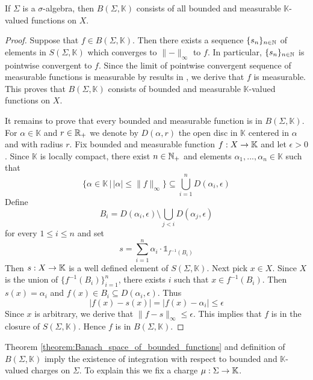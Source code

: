 \begin{theorem}\label{theorem:for_sigma_algebra_each_bounded_measurable_function_is_in_uniform_closure_of_simple_functions}
    If $\Sigma$ is a $\sigma$-algebra, then $B(\Sigma,\mathbb{K})$ consists of all bounded and measurable $\mathbb{K}$-valued functions on $X$. 
\end{theorem}
\begin{proof}
    Suppose that $f \in B(\Sigma,\mathbb{K})$. Then there exists a sequence $\{s_n\}_{n\in {\mathbb N}}$ of elements in $S(\Sigma,\mathbb{K})$ which converges to $\lVert - \rVert_{\infty}$ to $f$. In particular, $\{s_n\}_{n\in {\mathbb N}}$ is pointwise convergent to $f$. Since the limit of pointwise convergent sequence of measurable functions is measurable by results in \cite{Integration}, we derive that $f$ is measurable. This proves that $B(\Sigma,\mathbb{K})$ consists of bounded and measurable $\mathbb{K}$-valued functions on $X$. 
    
    It remains to prove that every bounded and measurable function is in $B(\Sigma,\mathbb{K})$. For $\alpha \in \mathbb{K}$ and $r \in {\mathbb R}_+$ we denote by $D(\alpha,r)$ the open disc in $\mathbb{K}$ centered in $\alpha$ and with radius $r$. Fix bounded and measurable function $f:X\rightarrow \mathbb{K}$ and let $\epsilon > 0$. Since $\mathbb{K}$ is locally compact, there exist $n\in {\mathbb N}_+$ and elements $\alpha_1,...,\alpha_n \in \mathbb{K}$ such that
    $$\big\{\alpha \in \mathbb{K}\,\big|\,|\alpha| \leq \lVert f\rVert_{\infty}\big\}\subseteq \bigcup_{i=1}^nD(\alpha_i,\epsilon)$$
    Define
    $$B_i = D(\alpha_i,\epsilon)\setminus \bigcup_{j < i}D(\alpha_j,\epsilon)$$
    for every $1\leq i \leq n$ and set
    $$s = \sum_{i=1}^n\alpha_i\cdot \mathbb{1}_{f^{-1}(B_i)}$$
    Then $s:X\rightarrow \mathbb{K}$ is a well defined element of $S(\Sigma,\mathbb{K})$. Next pick $x \in X$. Since $X$ is the union of $\{f^{-1}(B_i)\}_{i=1}^n$,
    there exists $i$ such that $x \in f^{-1}(B_i)$. Then $s(x) = \alpha_i$ and $f(x) \in B_i\subseteq D(\alpha_i,\epsilon)$. Thus
    $$|f(x) - s(x)| = |f(x) - \alpha_i|\leq \epsilon$$
    Since $x$ is arbitrary, we derive that $\lVert f - s\rVert_{\infty} \leq \epsilon$. This implies that $f$ is in the closure of $S(\Sigma,\mathbb{K})$. Hence $f$ is in $B(\Sigma, \mathbb{K})$.
\end{proof}
\noindent
Theorem \ref{theorem:Banach_space_of_bounded_functions} and definition of $B(\Sigma,\mathbb{K})$ imply the existence of integration with respect to bounded and $\mathbb{K}$-valued charges on $\Sigma$. To explain this we fix a charge $\mu:\Sigma \rightarrow \mathbb{K}$.

